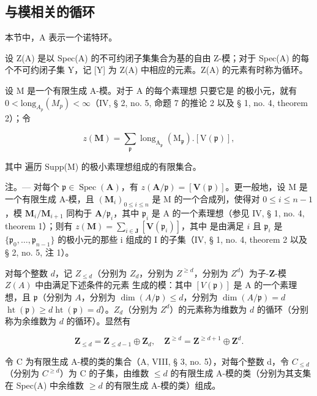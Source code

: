 \subsection{与模相关的循环}

本节中，A 表示一个诺特环。

{}{}设 Z(A) 是以 Spec(A) 的不可约闭子集集合为基的自由 Z-模；对于 Spec(A) 的每个不可约闭子集 Y，记 [Y] 为 Z(A) 中相应的元素。Z(A) 的元素有时称为循环。

设 M 是一个有限生成 A-模。对于 A 的每个素理想 只要它是  的极小元，就有 \(0 < \text{long}_{A_{p}}(M_{p}) < \infty\)（IV, § 2, no. 5, 命题 7 的推论 2 以及 § 1, no. 4, theorem 2）；令

\[
z (\mathbf {M}) = \sum_ {\mathfrak {p}} \operatorname{long} _ {\mathrm{A} _ {\mathfrak {p}}} (\mathrm{M} _ {\mathfrak {p}}). [ \mathrm{V} (\mathfrak {p}) ],
\]

其中  遍历 Supp(M) 的极小素理想组成的有限集合。

注。--- 对每个 \(\mathfrak{p} \in \operatorname{Spec}(\mathbf{A})\)，有 \(z(\mathbf{A}/\mathfrak{p}) = [\mathbf{V}(\mathfrak{p})]\)。更一般地，设 M 是一个有限生成 A-模，且 \((\mathbf{M}_i)_{0 \leqslant i \leqslant n}\) 是 M 的一个合成列，使得对 \(0 \leqslant i \leqslant n - 1\)，模 \(\mathbf{M}_i / \mathbf{M}_{i+1}\) 同构于 \(\mathbf{A}/\mathfrak{p}_i\)，其中 \(\mathfrak{p}_i\) 是 A 的一个素理想（参见 IV, § 1, no. 4, theorem 1）；则有 \(z(\mathbf{M}) = \sum_{i \in \mathbf{J}} [\mathbf{V}(\mathfrak{p}_i)]\)，其中  是由满足 \(i\) 且 \(\mathfrak{p}_i\) 是 \(\{\mathfrak{p}_0, \ldots, \mathfrak{p}_{n-1}\}\) 的极小元的那些 i 组成的 I 的子集（IV, § 1, no. 4, theorem 2 以及 § 2, no. 5, 注 1）。

对每个整数 \(d\)，记 \(Z_{\leq d}\)（分别为 \(Z_d\)，分别为 \(Z^{\geq d}\)，分别为 \(Z^d\)）为子-\(\mathbf{Z}\)-模 \(Z(A)\) 中由满足下述条件的元素  生成的模：其中 \([V(\mathfrak{p})]\) 是 A 的一个素理想，且 \(\mathfrak{p}\)（分别为 \(A\)，分别为 \(\dim(A/\mathfrak{p}) \leqslant d\)，分别为 \(\dim(A/\mathfrak{p}) = d\)\(\operatorname{ht}(\mathfrak{p}) \geqslant d\)\(\operatorname{ht}(\mathfrak{p}) = d\)）。\(Z_{d}\)（分别为 \(Z^{d}\)）的元素称为维数为 \(d\) 的循环（分别称为余维数为 \(d\) 的循环）。显然有

\[
\mathbf {Z} _ {\leqslant d} = \mathbf {Z} _ {\leqslant d - 1} \oplus \mathbf {Z} _ {d}, \quad \mathbf {Z} ^ {\geqslant d} = \mathbf {Z} ^ {\geqslant d + 1} \oplus \mathbf {Z} ^ {d}.
\]

令 C 为有限生成 A-模的类的集合（A, VIII, § 3, no. 5），对每个整数 d，令 \(C_{\leq d}\)（分别为 \(C^{\geq d}\)）为 C 的子集，由维数 \(\leq d\) 的有限生成 A-模的类（分别为其支集在 Spec(A) 中余维数 \(\geq d\) 的有限生成 A-模的类）组成。

